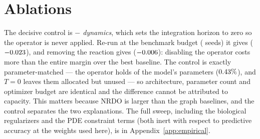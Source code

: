 \section{Ablations}
\label{sec:ablations}

The decisive control is \emph{$-$ dynamics}, which sets the integration horizon
to zero so the operator is never applied. Re-run at the benchmark budget
(\MatchedSeeds{} seeds) it gives \MatchedNoDynamics{}
($-0.023$), and removing the reaction gives
\MatchedNoReaction{} ($-0.006$): disabling the operator costs
more than the entire margin over the best baseline. The control is exactly
parameter-matched --- the operator holds \OpParams{} of the model's
\TotalParams{} parameters ($0.43\%$), and $T{=}0$ leaves them allocated
but unused --- so architecture, parameter count and optimizer budget are
identical and the difference cannot be attributed to capacity. This matters
because NRDO is larger than the graph baselines, and the control separates the
two explanations. The full sweep, including the biological regularizers and the
PDE constraint terms (both inert with respect to predictive accuracy at the
weights used here), is in Appendix~\ref{app:empirical}.
